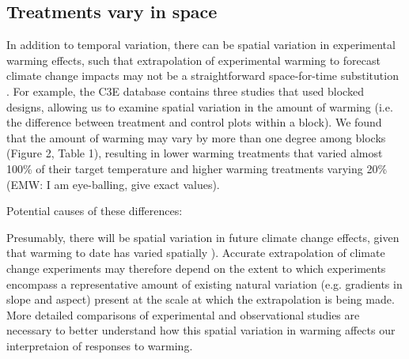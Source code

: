 \documentclass{article}
\begin{document}
\subsection* {Treatments vary in space}
In addition to temporal variation, there can be spatial variation in experimental warming effects, such that extrapolation of experimental warming to forecast climate change impacts may not be a straightforward space-for-time substitution \citep{johnson2008,jochner2013}. For example, the C3E database contains three studies that used blocked designs, allowing us to examine spatial variation in the amount of warming (i.e. the difference between treatment and control plots within a block). We found that the amount of warming may vary by more than one degree among blocks (Figure 2, Table 1), resulting in lower warming treatments that varied almost 100\% of their target temperature and higher warming treatments varying 20\% (EMW: I am eye-balling, give exact values).%
\par Potential causes of these differences: %
\par Presumably, there will be spatial variation in future climate change effects, given that warming to date has varied spatially \citep{ipcc2013}).  Accurate extrapolation of climate change experiments may therefore depend on the extent to which experiments encompass a representative amount of existing natural variation (e.g. gradients in slope and aspect) present at the scale at which the extrapolation is being made. More detailed comparisons of experimental and observational studies are necessary to better understand how this spatial variation in warming affects our interpretaion of responses to warming. 
\end{document}
